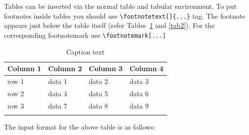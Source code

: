 \documentclass[sn-mathphys]{sn-jnl}%
\theoremstyle{thmstyleone}%
\theoremstyle{thmstyletwo}%
\theoremstyle{thmstylethree}%
\begin{document}
Tables can be inserted via the normal table and tabular environment. To put
footnotes inside tables you should use \verb+\footnotetext[]{...}+ tag.
The footnote appears just below the table itself (refer Tables~\ref{tab1} and \ref{tab2}). 
For the corresponding footnotemark use \verb+\footnotemark[...]+

\begin{table}[h]
\begin{center}
\begin{minipage}{174pt}
\caption{Caption text}\label{tab1}%
\begin{tabular}{@{}llll@{}}
\toprule
Column 1 & Column 2  & Column 3 & Column 4\\
\midrule
row 1    & data 1   & data 2  & data 3  \\
row 2    & data 4   & data 5\footnotemark[1]  & data 6  \\
row 3    & data 7   & data 8  & data 9\footnotemark[2]  \\
\botrule
\end{tabular}
\end{minipage}
\end{center}
\end{table}

\noindent
The input format for the above table is as follows:
\end{document}
